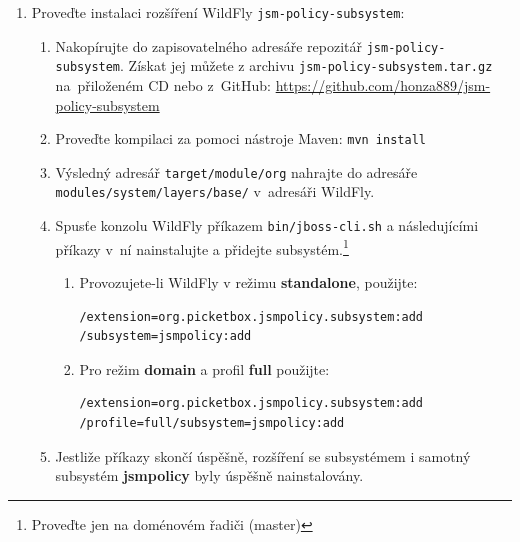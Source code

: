 \begin{enumerate}
  \item Proveďte instalaci rozšíření WildFly {\tt jsm-policy-subsystem}:
  \begin{enumerate}
    \item Nakopírujte do zapisovatelného adresáře repozitář {\tt jsm-policy-subsystem}. Získat jej můžete z archivu {\tt jsm-policy-subsystem.tar.gz} na~přiloženém CD nebo z~GitHub:
      \newline\url{https://github.com/honza889/jsm-policy-subsystem}
    \item Proveďte kompilaci za pomoci nástroje Maven: {\tt mvn install}
    \item Výsledný adresář {\tt target/module/org} nahrajte do adresáře {\tt modules/system/la\linebreak yers/base/} v~adresáři WildFly.
    \item Spusťe konzolu WildFly příkazem {\tt bin/jboss-cli.sh} a následujícími příkazy v~ní nainstalujte a přidejte subsystém.\footnote{\label{master}Proveďte jen na doménovém řadiči (master)}
    \begin{enumerate}
     \item Provozujete-li WildFly v režimu {\bf standalone}, použijte:
      \begin{lstlisting}
/extension=org.picketbox.jsmpolicy.subsystem:add
/subsystem=jsmpolicy:add
      \end{lstlisting}
     \item Pro režim {\bf domain} a profil {\bf full} použijte:
      \begin{lstlisting}
/extension=org.picketbox.jsmpolicy.subsystem:add
/profile=full/subsystem=jsmpolicy:add
      \end{lstlisting}
    \end{enumerate}
    \item Jestliže příkazy skončí úspěšně, rozšíření se subsystémem i samotný subsystém {\bf jsmpolicy} byly úspěšně nainstalovány.
  \end{enumerate}
  

\end{enumerate}
